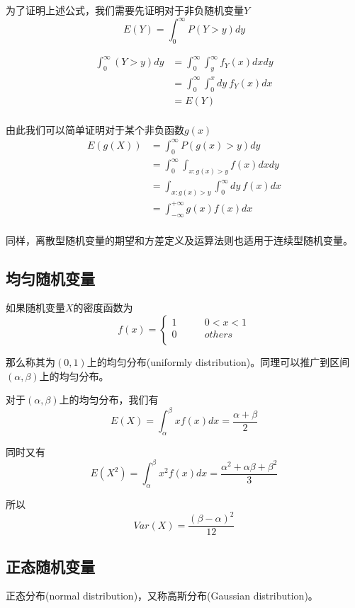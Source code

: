 \documentclass[UTF8]{ctexart}
\begin{document}
为了证明上述公式，我们需要先证明对于非负随机变量$Y$
$$E(Y)=\int_{0}^{\infty }P(Y>y)dy $$

$$\begin{aligned}
\int_{0}^{\infty }(Y>y)dy&=\int_{0}^{\infty }\int_{y}^{\infty }f_{Y}(x)dxdy\\
&=\int_{0}^{\infty } \int_{0}^{x}dy~f_{Y}(x)dx \\
&=E(Y) \\
\end{aligned} $$

由此我们可以简单证明对于某个非负函数$g(x)$
$$\begin{aligned}
E(g(X))&=\int_{0}^{\infty }P(g(x)>y)dy\\
&=\int_{0}^{\infty }\int_{x:g(x)>y}f(x)dxdy\\
&=\int_{x:g(x)>y} \int_{0}^{\infty }dy~f(x)dx\\
&=\int_{-\infty }^{+\infty }g(x)f(x)dx\\
\end{aligned} $$

同样，离散型随机变量的期望和方差定义及运算法则也适用于连续型随机变量。

\subsection{均匀随机变量}

如果随机变量$X$的密度函数为
$$f(x)=\left \{
\begin{array}{ll}
1&\qquad 0<x<1\\
0&\qquad others\\
\end{array}
\right.
$$

那么称其为$(0,1)$上的均匀分布(uniformly distribution)。同理可以推广到区间$(\alpha ,\beta )$上的均匀分布。

对于$(\alpha ,\beta )$上的均匀分布，我们有
$$E(X)=\int_{\alpha }^{\beta }xf(x)dx=\frac{\alpha +\beta }{2}$$

同时又有
$$E(X^{2})=\int_{\alpha }^{\beta }x^{2}f(x)dx=\frac{\alpha^{2}+\alpha \beta +\beta^{2}}{3} $$

所以
$$Var(X)=\frac{(\beta -\alpha )^{2}}{12} $$

\subsection{正态随机变量}

正态分布(normal distribution)，又称高斯分布(Gaussian distribution)。
\end{document}
